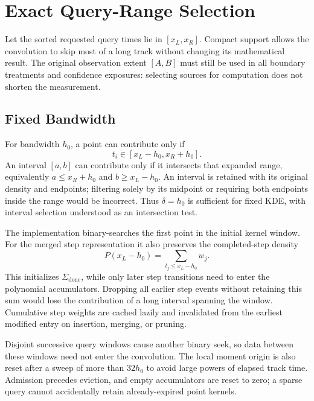 \documentclass[11pt,a4paper]{article}
\begin{document}
\section{Exact Query-Range Selection}
\label{sec:queryRange}

Let the sorted requested query times lie in $[x_L,x_R]$.  Compact support
allows the convolution to skip most of a long track without changing its
mathematical result.  The original observation extent $[A,B]$ must still
be used in all boundary treatments and confidence exposures: selecting
sources for computation does not shorten the measurement.

\subsection{Fixed Bandwidth}

For bandwidth $h_0$, a point can contribute only if
\begin{equation}
  t_i\in[x_L-h_0,x_R+h_0].
\end{equation}
An interval $[a,b]$ can contribute only if it intersects that expanded
range, equivalently $a\le x_R+h_0$ and $b\ge x_L-h_0$.  An interval is
retained with its original density and endpoints; filtering solely by its
midpoint or requiring both endpoints inside the range would be incorrect.
Thus $\delta=h_0$ is sufficient for fixed KDE, with interval selection
understood as an intersection test.

The implementation binary-searches the first point in the initial kernel
window.  For the merged step representation it also preserves the
completed-step density
\begin{equation}
  P(x_L-h_0)=\sum_{t_j\le x_L-h_0}w_j.
\end{equation}
This initializes $\Sigma_{\mathrm{done}}$, while only later step transitions
need to enter the polynomial accumulators.  Dropping all earlier step
events without retaining this sum would lose the contribution of a long
interval spanning the window.  Cumulative step weights are cached lazily
and invalidated from the earliest modified entry on insertion, merging,
or pruning.

Disjoint successive query windows cause another binary seek, so data
between these windows need not enter the convolution.  The local moment
origin is also reset after a sweep of more than $32h_0$ to avoid large
powers of elapsed track time.  Admission precedes eviction, and empty
accumulators are reset to zero; a sparse query cannot accidentally retain
already-expired point kernels.
\end{document}
